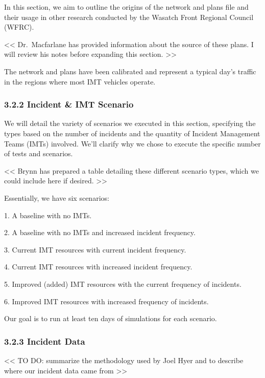 \documentclass[
  letterpaper,
  DIV=11,
  numbers=noendperiod]{scrreprt}
\begin{document}
In this section, we aim to outline the origins of the network and plans
file and their usage in other research conducted by the Wasatch Front
Regional Council (WFRC).

\textless\textless{} Dr.~Macfarlane has provided information about the
source of these plans. I will review his notes before expanding this
section. \textgreater\textgreater{}

The network and plans have been calibrated and represent a typical day's
traffic in the regions where most IMT vehicles operate.

\hypertarget{incident-imt-scenario}{%
\subsubsection{3.2.2 Incident \& IMT
Scenario}\label{incident-imt-scenario}}

We will detail the variety of scenarios we executed in this section,
specifying the types based on the number of incidents and the quantity
of Incident Management Teams (IMTs) involved. We'll clarify why we chose
to execute the specific number of tests and scenarios.

\textless\textless{} Brynn has prepared a table detailing these
different scenario types, which we could include here if desired.
\textgreater\textgreater{}

Essentially, we have six scenarios:

1. A baseline with no IMTs.

2. A baseline with no IMTs and increased incident frequency.

3. Current IMT resources with current incident frequency.

4. Current IMT resources with increased incident frequency.

5. Improved (added) IMT resources with the current frequency of
incidents.

6. Improved IMT resources with increased frequency of incidents.

Our goal is to run at least ten days of simulations for each scenario.

\hypertarget{incident-data}{%
\subsubsection{3.2.3 Incident Data}\label{incident-data}}

\textless\textless{} TO DO: summarize the methodology used by Joel Hyer
and to describe where our incident data came from
\textgreater\textgreater{}
\end{document}
